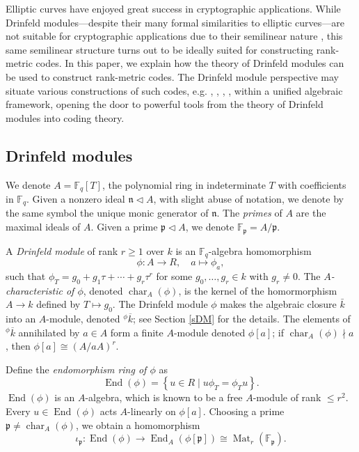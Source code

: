 \documentclass[12pt]{amsart}
\theoremstyle{definition}
\theoremstyle{remark}
\numberwithin{equation}{section}
\numberwithin{thm}{section}
\DeclareMathOperator{\End}{End}
\DeclareMathOperator{\chr}{char}
\DeclareMathOperator{\Mat}{Mat}
\newcommand{\fn}{\mathfrak{n}}
\newcommand{\fp}{\mathfrak{p}}
\newcommand{\F}{\mathbb{F}}
\newcommand{\To}{\longrightarrow}
\begin{document}
Elliptic curves have enjoyed great success in cryptographic applications. 
While Drinfeld modules---despite their many formal similarities to elliptic curves---are not suitable for cryptographic applications due to their semilinear nature \cite{Scanlon}, this same semilinear structure turns out to be ideally suited for constructing rank-metric codes. 
In this paper, we explain how the theory of Drinfeld modules can be used to construct rank-metric codes. 
The Drinfeld module perspective may situate various constructions of such codes, 
e.g. \cite{Sheekey}, \cite{TZ},  \cite{LSS}, \cite{GTLNS}, within a unified algebraic framework, 
opening the door to powerful tools from the theory of Drinfeld modules into coding theory.


\subsection{Drinfeld modules}\label{sIntroDM} 
We denote $A=\F_q[T]$, the polynomial ring in indeterminate $T$ with coefficients in $\F_q$. 
Given a nonzero ideal $\fn\lhd A$, with slight abuse of notation, we denote by the same symbol  
the unique monic generator of $\fn$. The \textit{primes} of $A$ are the maximal ideals of $A$. 
Given a prime $\fp\lhd A$, we denote $\F_\fp=A/\fp$. 

A \textit{Drinfeld module} of rank $r\geq 1$ over $k$ is an $\F_q$-algebra homomorphism 
\[\phi\colon A\to R,\quad  a\mapsto \phi_a, \] 
such that $\phi_T=g_0+g_1\tau+\cdots+g_r\tau^r$ for some $g_0, \dots, g_r\in k$ with $g_r\neq 0$. The \textit{$A$-characteristic of $\phi$}, 
denoted $\chr_A(\phi)$, is the kernel of the homormorphism $A\to k$ defined by $T\mapsto g_0$. The Drinfeld module $\phi$ makes the algebraic 
closure $\bar{k}$ into an $A$-module, denoted ${^\phi}\overline{k}$; see Section \ref{sDM} for the details. The elements of ${^\phi}\overline{k}$ 
annihilated by $a\in A$ form a finite $A$-module denoted $\phi[a]$; if $\chr_A(\phi)\nmid a$, then $\phi[a]\cong (A/aA)^r$. 

Define 
the \textit{endomorphism ring of $\phi$} as 
$$
\End(\phi)=\left\{u\in R\mid u\phi_T=\phi_Tu\right\}. 
$$
$\End(\phi)$ is an $A$-algebra, which is known to be a free $A$-module of rank $\leq r^2$. Every $u\in \End(\phi)$ acts $A$-linearly on $\phi[a]$. 
Choosing a prime $\fp\neq \chr_A(\phi)$, we obtain a homomorphism 
$$
\iota_\fp\colon \End(\phi)\To \End_A(\phi[\fp])\cong \Mat_r(\F_\fp). 
$$
\end{document}
